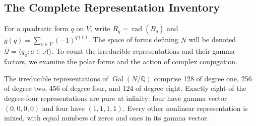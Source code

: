 \subsection{The Complete Representation Inventory}
For a quadratic form $q$ on $V$, write $R_q=\operatorname{rad}(B_q)$
and $g(q)=\sum_{v\in V}(-1)^{q(v)}$. The space of forms defining $N$
will be denoted $\mathcal Q=\langle q_a:a\in\mathcal A\rangle$.
To count the irreducible representations and their gamma factors, we
examine the polar forms and the action of complex conjugation.
\begin{lemma}\label{ar:representations}
The irreducible representations of $\operatorname{Gal}(N/\mathbb Q)$
comprise 128 of degree one, 256 of degree two, 456 of degree four, and
124 of degree eight. Exactly eight of the degree-four representations
are pure at infinity: four have gamma vector $(0,0,0,0)$ and four have
$(1,1,1,1)$. Every other nonlinear representation is mixed, with equal
numbers of zeros and ones in its gamma vector.
\end{lemma}
